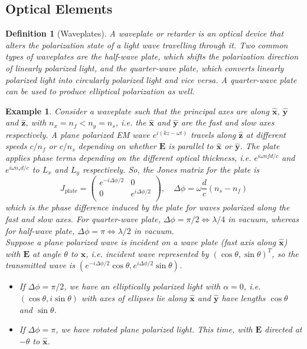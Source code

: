 \documentclass[a4paper]{article}
\newtheorem{defi}{Definition}[section]
\newtheorem{eg}{Example}[section]
\theoremstyle{new}
\begin{document}
\subsection{Optical Elements}
\begin{defi}[Waveplates]
A waveplate or retarder is an optical device that alters the polarization state of a light wave travelling through it. Two common types of waveplates are the half-wave plate, which shifts the polarization direction of linearly polarized light, and the quarter-wave plate, which converts linearly polarized light into circularly polarized light and vice versa. A quarter-wave plate can be used to produce elliptical polarization as well.
\end{defi}
\begin{eg}
Consider a waveplate such that the principal axes are along $\mathbf{\hat{x}}$, $\mathbf{\hat{y}}$ and $\mathbf{\hat{z}}$, with $n_x=n_f<n_y=n_s$, i.e. the $\mathbf{\hat{x}}$ and $\mathbf{\hat{y}}$ are the fast and slow axes respectively. A plane polarized EM wave $e^{i(kz-\omega t)}$ travels along $\mathbf{\hat{z}}$ at different speeds $c/n_f$ or $c/n_s$ depending on whether $\mathbf{E}$ is parallel to $\mathbf{\hat{x}}$ or $\mathbf{\hat{y}}$. The plate applies phase terms depending on the different optical thickness, i.e. $e^{i\omega nfd/c}$ and $e^{i\omega n_sd/c}$ to $L_x$ and $L_y$ respectively. So, the Jones matrix for the plate is
$$J_{\text{plate}}=\begin{pmatrix}e^{-i\Delta\phi/2}&0\\0&e^{i\Delta\phi/2}\\\end{pmatrix},\quad\Delta\phi=\omega\frac{d}{c}(n_s-n_f)$$
which is the phase difference induced by the plate for waves polarized along the fast and slow axes. For quarter-wave plate, $\Delta\phi=\pi/2\iff\lambda/4$ in vacuum, whereas for half-wave plate, $\Delta\phi=\pi\iff\lambda/2$ in vacuum.\\[5pt]
Suppose a plane polarized wave is incident on a wave plate (fast axis along $\mathbf{\hat{x}}$) with $\mathbf{E}$ at angle $\theta$ to $\mathbf{\hat{x}}$, i.e. incident wave represented by $(\cos\theta,\sin\theta)^T$, so the transmitted wave is $(e^{-i\Delta\phi/2}\cos\theta,e^{i\Delta\phi/2}\sin\theta)$. 
\begin{itemize}
    \item If $\Delta\phi=\pi/2$, we have an elliptically polarized light with $\alpha=0$, i.e. $(\cos\theta,i\sin\theta)$ with axes of ellipses lie along $\mathbf{\hat{x}}$ and $\mathbf{\hat{y}}$ have lengths $\cos\theta$ and $\sin\theta$. 
    \item If $\Delta\phi=\pi$, we have rotated plane polarized light. This time, with $\mathbf{E}$ directed at $-\theta$ to $\mathbf{\hat{x}}$.
\end{itemize}
\end{eg}
\end{document}
